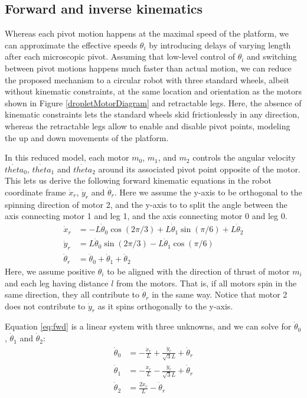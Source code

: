 \documentclass[letterpaper, 10pt, conference]{ieeeconf}
\begin{document}
\subsection{Forward and inverse kinematics}
Whereas each pivot motion happens at the maximal speed of the platform, we can approximate the effective speeds $\theta_i$ by introducing delays of varying length after each microscopic pivot. Assuming that low-level control of $\theta_i$ and switching between pivot motions happens much faster than actual motion, we can reduce the proposed mechanism to a circular robot with three standard wheels, albeit without kinematic constraints, at the same location and orientation as the motors shown in Figure \ref{dropletMotorDiagram} and retractable legs. Here, the absence of kinematic constraints lets the standard wheels skid frictionlessly in any direction, whereas the retractable legs allow to enable and disable pivot points, modeling the up and down movements of the platform. 

In this reduced model, each motor $m_0$, $m_1$, and $m_2$ controls the angular velocity $\dot{theta}_0$, $\dot{theta}_1$ and $\dot{theta}_2$ around its associated pivot point opposite of the motor. This lets us derive the following forward kinematic equations in the robot coordinate frame $\dot{x}_r$, $\dot{y}_r$ and $\dot{\theta}_r$.
Here we assume the y-axis to be orthogonal to the spinning direction of motor 2, and the y-axis to to split the angle between the axis connecting motor 1 and leg 1, and the axis connecting motor 0 and leg 0.
\begin{align}\label{eq:fwd}
\dot{x}_r & = -L \dot{\theta}_0 \cos(2 \pi / 3) + L \dot{\theta}_1 \sin(\pi / 6) + L \dot{\theta}_2\\
\dot{y}_r & =  L \dot{\theta}_0 \sin(2 \pi / 3) - L \dot{\theta}_1 \cos(\pi / 6)\\
\dot{\theta}_r & = \dot{\theta}_0 + \dot{\theta}_1 + \dot{\theta}_2
\end{align}
Here, we assume positive $\theta_i$ to be aligned with the direction of thrust of motor $m_i$ and each leg having distance $l$ from the motors. That is, if all motors spin in the same direction, they all contribute to $\dot{\theta}_r$ in the same way. Notice that motor 2 does not contribute to $\dot{y}_r$ as it spins orthogonally to the y-axis.

Equation \ref{eq:fwd} is a linear system with three unknowns, and we can solve for $\dot{\theta}_0$, $\dot{\theta}_1$ and $\dot{\theta}_2$:
\begin{align}
\dot{\theta}_0 & = -\frac{\dot{x}_r}{L} + \frac{\dot{y}_r}{\sqrt{3}L} + \dot{\theta}_r\\
\dot{\theta}_1 & = -\frac{\dot{x}_r}{L} - \frac{\dot{y}_r}{\sqrt{3}L} + \dot{\theta}_r\\
\dot{\theta}_2 & = \frac{2 \dot{x}_r}{L} - \dot{\theta}_r
\end{align}
\end{document}
